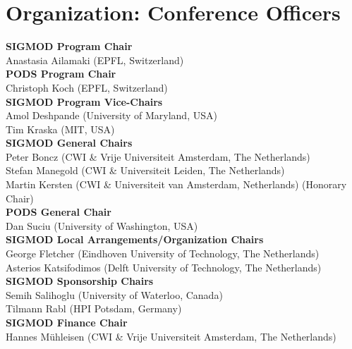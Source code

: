 \clearpage
\ifodd\value{page}\hbox{}\newpage\fi
\section*{Organization: Conference Officers}

{\small

\textbf{SIGMOD Program Chair}
\\ Anastasia Ailamaki \textsf{\footnotesize(EPFL, Switzerland)}
\\[2.4ex]
\textbf{PODS Program Chair}
\\ Christoph Koch \textsf{\footnotesize(EPFL, Switzerland)}
\\[2.4ex]
\textbf{SIGMOD Program Vice-Chairs}
\\ Amol Deshpande \textsf{\footnotesize(University of Maryland, USA)}
\\ Tim Kraska \textsf{\footnotesize(MIT, USA)}
\\[2.4ex]
\textbf{SIGMOD General Chairs}
\\ Peter Boncz \textsf{\footnotesize(CWI \& Vrije Universiteit Amsterdam, The Netherlands)}
\\ Stefan Manegold \textsf{\footnotesize(CWI \& Universiteit Leiden, The Netherlands)}
\\ Martin Kersten \textsf{\footnotesize(CWI \& Universiteit van Amsterdam, Netherlands) (Honorary Chair)}
\\[2.4ex]
\textbf{PODS General Chair}
\\ Dan Suciu \textsf{\footnotesize(University of Washington, USA)}
\\[2.4ex]
\textbf{SIGMOD Local Arrangements/Organization Chairs}
\\ George Fletcher \textsf{\footnotesize(Eindhoven University of Technology, The Netherlands)}
\\ Asterios Katsifodimos \textsf{\footnotesize(Delft University of Technology, The Netherlands)}
\\[2.4ex]
\textbf{SIGMOD Sponsorship Chairs}
\\ Semih Salihoglu \textsf{\footnotesize(University of Waterloo, Canada)}
\\ Tilmann Rabl \textsf{\footnotesize(HPI Potsdam, Germany)}
\\[2.4ex]
\textbf{SIGMOD Finance Chair}
\\ Hannes Mühleisen \textsf{\footnotesize(CWI \& Vrije Universiteit Amsterdam, The Netherlands)}
}
